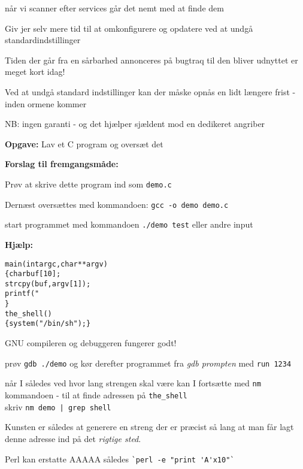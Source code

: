 \documentclass[20pt,landscape,a4paper,footrule]{foils}
\begin{document}

\begin{list1}
\item når vi scanner efter services går det nemt med at finde dem
\item Giv jer selv mere tid til at omkonfigurere og opdatere ved at undgå standardindstillinger
\item Tiden der går fra en sårbarhed annonceres på bugtraq til den
  bliver udnyttet er meget kort idag! 
\item Ved at undgå standard indstillinger kan der
  måske opnås en lidt længere frist - inden ormene kommer
\item NB: ingen garanti - og det hjælper sjældent mod en dedikeret angriber
\end{list1}


{\bfseries Opgave:} Lav et C program og oversæt det

{\bfseries Forslag til fremgangsmåde:}
\begin{list2}
\item Prøv at skrive dette program ind som \verb+demo.c+
\item Dernæst oversættes med kommandoen:
\verb+gcc -o demo demo.c+
\item start programmet med kommandoen
\verb+./demo test+ eller andre input
\end{list2}

{\bfseries Hjælp:}
\begin{alltt}
main(int argc, char **argv)
\{      char buf[10];
        strcpy(buf, argv[1]); 
        printf("%s\textbackslash{}n",buf);
\}
the_shell()
\{  system("/bin/sh");  \}
\end{alltt}



\begin{list1}
  \item GNU compileren og debuggeren fungerer godt!
\item prøv \verb+gdb ./demo+ og kør derefter programmet fra \emph{gdb prompten}
med  \verb+run 1234+
\item når I således ved hvor lang strengen skal være kan I fortsætte
  med \verb+nm+ kommandoen - til at finde adressen på
  \verb+the_shell+\\
skriv \verb+nm demo | grep shell+

\item Kunsten er således at generere en streng der er præcist så lang
  at man får lagt denne adresse ind på det \emph{rigtige sted}.
\item Perl kan erstatte AAAAA således \verb+`perl -e "print 'A'x10"`+
\end{list1}
\end{document}
